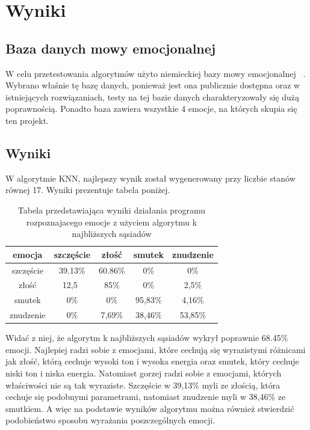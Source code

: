 \documentclass[declaration,shortabstract]{iithesis}
\begin{document}
\chapter{Wyniki}
\section{Baza danych mowy emocjonalnej}
W celu przetestowania algorytmów użyto niemieckiej bazy mowy emocjonalnej ~\cite{BDemo}. Wybrano właśnie tę bazę danych, ponieważ jest ona publicznie dostępna oraz w istniejących rozwiązaniach, testy na tej bazie danych charakteryzowały się dużą poprawnością. Ponadto baza zawiera wszystkie 4 emocje, na których skupia się ten projekt.

\section{Wyniki}
W algorytmie KNN, najlepszy wynik został wygenerowany przy liczbie stanów równej 17. Wyniki prezentuje tabela poniżej.

\begin{table}[t]
\caption{Tabela przedstawiająca wyniki działania programu rozpoznajacego emocje z użyciem algorytmu k najbliższych sąsiadów}
\begin{center}
  \begin{tabular}{| c | c | c | c | c |}
    \hline
    emocja & szczęście & złość & smutek & znudzenie \\ \hline
    szczęście & 39.13\% & 60.86\% & 0\% & 0\% \\ \hline
	złość & 12,5\ & 85\% & 0\% & 2,5\% \\ \hline
	smutek & 0\% & 0\% & 95,83\% & 4,16\% \\ \hline
	znudzenie & 0\% & 7,69\% & 38,46\% & 53,85\% \\
    \hline
  \end{tabular}
\end{center}
\end{table}

Widać z niej, że algorytm k najbliższych sąsiadów wykrył poprawnie 68.45\% emocji. Najlepiej radzi sobie z emocjami, które cechują się wyrazistymi różnicami jak złość, którą cechuje wysoki ton i wysoka energia oraz smutek, który cechuje niski ton i niska energia. Natomiast gorzej radzi sobie z emocjami, których właściwości nie są tak wyraziste. Szczęście w 39,13\% myli ze złością, która cechuje się podobnymi parametrami, natomiast znudzenie myli w 38,46\% ze smutkiem. A więc na podstawie wyników algorytmu można również stwierdzić podobieństwo sposobu wyrażania poszczególnych emocji.
\end{document}
